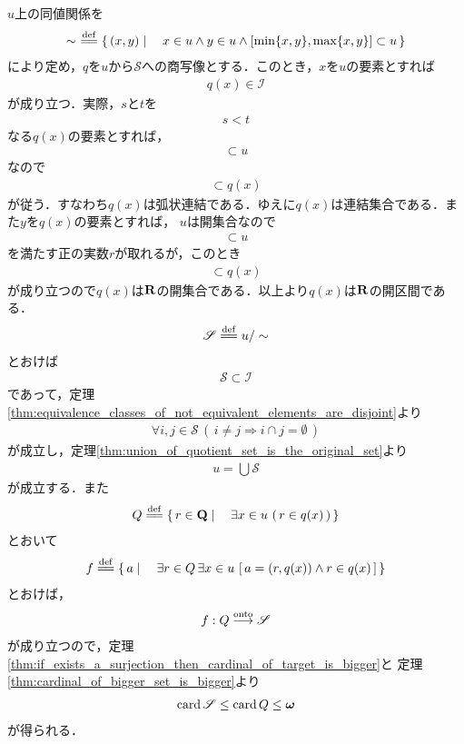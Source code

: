 	\begin{sketch}
		$u$上の同値関係を
		\begin{align}
			\sim\ \defeq \Set{(x,y)}{x \in u \wedge y \in u \wedge \left[\min\{x,y\},\max\{x,y\}\right] \subset u}
		\end{align}
		により定め，$q$を$u$から$\mathscr{S}$への商写像とする．このとき，$x$を$u$の要素とすれば
		\begin{align}
			q(x) \in \mathscr{I}
		\end{align}
		が成り立つ．実際，$s$と$t$を
		\begin{align}
			s < t
		\end{align}
		なる$q(x)$の要素とすれば，
		\begin{align}
			[s,t] \subset u
		\end{align}
		なので
		\begin{align}
			[s,t] \subset q(x)
		\end{align}
		が従う．すなわち$q(x)$は弧状連結である．ゆえに$q(x)$は連結集合である．また$y$を$q(x)$の要素とすれば，
		$u$は開集合なので
		\begin{align}
			[y-r,y+r] \subset u
		\end{align}
		を満たす正の実数$r$が取れるが，このとき
		\begin{align}
			[y-r,y+r] \subset q(x)
		\end{align}
		が成り立つので$q(x)$は$\mathbf{R}$の開集合である．以上より$q(x)$は$\mathbf{R}$の開区間である．
		\begin{align}
			\mathscr{S} \defeq u/\sim
		\end{align}
		とおけば
		\begin{align}
			\mathscr{S} \subset \mathscr{I}
		\end{align}
		であって，定理\ref{thm:equivalence_classes_of_not_equivalent_elements_are_disjoint}より
		\begin{align}
			\forall i,j \in \mathscr{S}\, \left(\, i \neq j \Longrightarrow i \cap j = \emptyset\, \right)
		\end{align}
		が成立し，定理\ref{thm:union_of_quotient_set_is_the_original_set}より
		\begin{align}
			u = \bigcup \mathscr{S}
		\end{align}
		が成立する．また
		\begin{align}
			Q \defeq \Set{r \in \Q}{\exists x \in u\, \left(\, r \in q(x)\, \right)}
		\end{align}
		とおいて
		\begin{align}
			f \defeq \Set{a}{\exists r \in Q \, \exists x \in u\, \left[\, a = (r,q(x)) \wedge r \in q(x)\, \right]}
		\end{align}
		とおけば，
		\begin{align}
			f: Q \overset{\mathrm{onto}}{\longrightarrow} \mathscr{S}
		\end{align}
		が成り立つので，定理\ref{thm:if_exists_a_surjection_then_cardinal_of_target_is_bigger}と
		定理\ref{thm:cardinal_of_bigger_set_is_bigger}より
		\begin{align}
			\operatorname{card} \mathscr{S} \leq \operatorname{card} Q \leq {\boldsymbol \omega}
		\end{align}
		が得られる．
		\QED
	\end{sketch}
	
